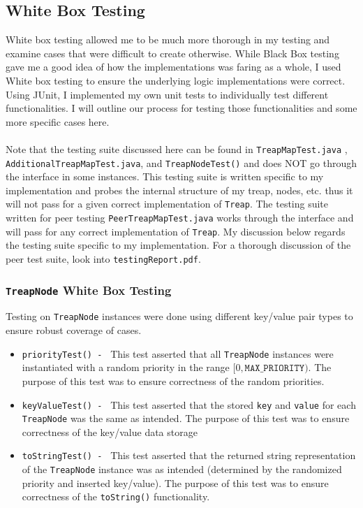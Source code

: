 \documentclass[11pt]{article}
\def\tt{\texttt}
\def\Treap{\tt{Treap}}
\def\tn{\tt{TreapNode}}
\begin{document}
\subsection{White Box Testing}
White box testing allowed me to be much more thorough in my testing and examine cases that were difficult to create otherwise. While Black Box testing gave me a good idea of how the implementations was faring as a whole, I used White box testing to ensure the underlying logic implementations were correct. Using JUnit, I implemented my own unit tests to individually test different functionalities. I will outline our process for testing those functionalities and some more specific cases here. \\ \\
Note that the testing suite discussed here can be found in \tt{TreapMapTest.java} ,  \\ \tt{AdditionalTreapMapTest.java}, and \tt{TreapNodeTest()} and does NOT go through the interface in some instances. This testing suite is written specific to my implementation and probes the internal structure of my treap, nodes, etc. thus it will not pass for a given correct implementation of \Treap. The testing suite written for peer testing \tt{PeerTreapMapTest.java} works through the interface and will pass for any correct implementation of \Treap. My discussion below regards the testing suite specific to my implementation. For a thorough discussion of the peer test suite, look into \tt{testingReport.pdf}.
\subsubsection{\tn{} White Box Testing}
Testing on \tn{} instances were done using different key/value pair types to ensure robust coverage of cases.
\begin{itemize}
	\item \tt{priorityTest() - } This test asserted that all \tn{} instances were instantiated with a random priority in the range $[0, \tt{MAX\_PRIORITY})$. The purpose of this test was to ensure correctness of the random priorities.
	\item \tt{keyValueTest() - } This test asserted that the stored \tt{key} and \tt{value} for each \tn{} was the same as intended. The purpose of this test was to ensure correctness of the key/value data storage
	\item \tt{toStringTest() - } This test asserted that the returned string representation of the \tn{} instance was as intended (determined by the randomized priority and inserted key/value). The purpose of this test was to ensure correctness of the \tt{toString()} functionality.
\end{itemize}
\end{document}
